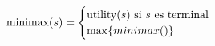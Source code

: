 \documentclass[preview]{standalone}
\begin{document}
\begin{align*}
\text{minimax($s$)} =  \begin{cases}\text{utility($s$) si $s$ es terminal} \cr
                                 \max\{minimax()\}\cr
                                 \end{cases}
\end{align*}
\end{document}
